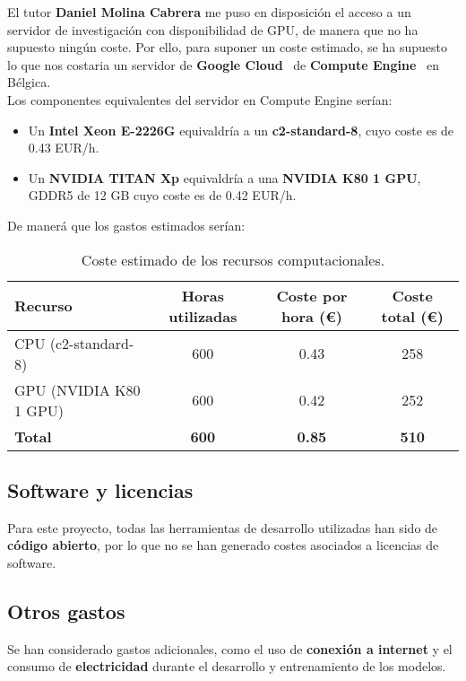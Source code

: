El tutor \textbf{Daniel Molina Cabrera} me puso en disposición el acceso a un servidor de investigación con
disponibilidad de GPU, de manera que no ha supuesto ningún coste.
Por ello, para suponer un coste estimado, se ha supuesto lo que nos costaria un servidor de
\textbf{Google Cloud}~\cite{} de \textbf{Compute Engine}~\cite{} en Bélgica. \\[6pt]

Los componentes equivalentes del servidor en Compute Engine serían:
\begin{itemize}
    \item Un \textbf{Intel Xeon E-2226G} equivaldría a un \textbf{c2-standard-8}, cuyo coste es de 0.43 EUR/h.
    \item Un \textbf{NVIDIA TITAN Xp} equivaldría a una \textbf{NVIDIA K80 1 GPU}, GDDR5 de 12 GB cuyo coste es de 0.42
EUR/h.
\end{itemize}

De manerá que los gastos estimados serían:
\begin{table}[htp]\label{tab:recursos-computacionales}
    \centering
    \begin{adjustbox}{width=\linewidth}
        \begin{tabular}{|l|c|c|c|}
            \hline
            \textbf{Recurso} & \textbf{Horas utilizadas} & \textbf{Coste por hora (€)} & \textbf{Coste total (€)} \\ \hline
            CPU (c2-standard-8) & 600 & 0.43 & 258 \\
            GPU (NVIDIA K80 1 GPU) & 600 & 0.42 & 252 \\ \hline
            \textbf{Total} & \textbf{600} & \textbf{0.85} & \textbf{510} \\ \hline
        \end{tabular}
    \end{adjustbox}
    \caption{Coste estimado de los recursos computacionales.}
\end{table}


\subsection{Software y licencias}\label{subsec:software-y-licencias}
Para este proyecto, todas las herramientas de desarrollo utilizadas han sido de \textbf{código abierto}, por lo que no
se han generado costes asociados a licencias de software.

\subsection{Otros gastos}\label{subsec:otros-gastos}
Se han considerado gastos adicionales, como el uso de \textbf{conexión a internet} y el consumo de
\textbf{electricidad} durante el desarrollo y entrenamiento de los modelos.

